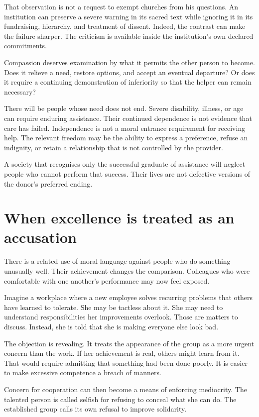 \documentclass[12pt,a4paper]{book}
\begin{document}
That observation is not a request to exempt churches from his questions. An institution can preserve a severe warning in its sacred text while ignoring it in its fundraising, hierarchy, and treatment of dissent. Indeed, the contrast can make the failure sharper. The criticism is available inside the institution's own declared commitments.

Compassion deserves examination by what it permits the other person to become. Does it relieve a need, restore options, and accept an eventual departure? Or does it require a continuing demonstration of inferiority so that the helper can remain necessary?

There will be people whose need does not end. Severe disability, illness, or age can require enduring assistance. Their continued dependence is not evidence that care has failed. Independence is not a moral entrance requirement for receiving help. The relevant freedom may be the ability to express a preference, refuse an indignity, or retain a relationship that is not controlled by the provider.

A society that recognises only the successful graduate of assistance will neglect people who cannot perform that success. Their lives are not defective versions of the donor's preferred ending.

\section*{When excellence is treated as an accusation}

There is a related use of moral language against people who do something unusually well. Their achievement changes the comparison. Colleagues who were comfortable with one another's performance may now feel exposed.

Imagine a workplace where a new employee solves recurring problems that others have learned to tolerate. She may be tactless about it. She may need to understand responsibilities her improvements overlook. Those are matters to discuss. Instead, she is told that she is making everyone else look bad.

The objection is revealing. It treats the appearance of the group as a more urgent concern than the work. If her achievement is real, others might learn from it. That would require admitting that something had been done poorly. It is easier to make excessive competence a breach of manners.

Concern for cooperation can then become a means of enforcing mediocrity. The talented person is called selfish for refusing to conceal what she can do. The established group calls its own refusal to improve solidarity.
\end{document}
